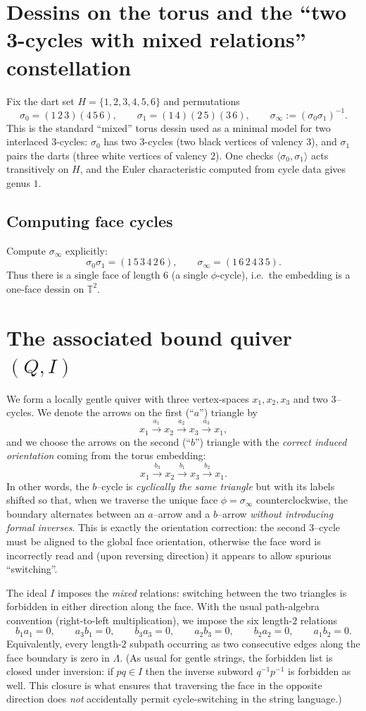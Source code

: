 \documentclass[11pt,oneside]{amsbook}
\numberwithin{equation}{section}
\theoremstyle{plain}
\theoremstyle{definition}
\theoremstyle{remark}
\begin{document}
\section{Dessins on the torus and the ``two 3-cycles with mixed relations'' constellation}
Fix the dart set $H=\{1,2,3,4,5,6\}$ and permutations
\[
\sigma_0=(1\,2\,3)(4\,5\,6),\qquad
\sigma_1=(1\,4)(2\,5)(3\,6),
\qquad
\sigma_\infty := (\sigma_0\sigma_1)^{-1}.
\]
This is the standard ``mixed'' torus dessin used as a minimal model for two interlaced 3-cycles:
$\sigma_0$ has two 3-cycles (two black vertices of valency $3$), and $\sigma_1$ pairs the darts (three white vertices of valency $2$).
One checks $\langle\sigma_0,\sigma_1\rangle$ acts transitively on $H$, and the Euler characteristic computed from cycle data
gives genus $1$.

\subsection{Computing face cycles}
Compute $\sigma_\infty$ explicitly:
\[
\sigma_0\sigma_1=(1\,5\,3\,4\,2\,6),
\qquad
\sigma_\infty=(1\,6\,2\,4\,3\,5).
\]
Thus there is a single face of length $6$ (a single $\phi$-cycle), i.e.\ the embedding is a one-face dessin on $\mathbb T^2$.

\section{The associated bound quiver $(Q,I)$}
We form a locally gentle quiver with three vertex-spaces $x_1,x_2,x_3$ and two $3$--cycles.
We denote the arrows on the first (``$a$'') triangle by
\[
x_1\xrightarrow{a_1}x_2\xrightarrow{a_2}x_3\xrightarrow{a_3}x_1,
\]
and we choose the arrows on the second (``$b$'') triangle with the \emph{correct induced orientation} coming from the torus embedding:
\[
x_1\xrightarrow{b_3}x_2\xrightarrow{b_1}x_3\xrightarrow{b_2}x_1.
\]
In other words, the $b$--cycle is \emph{cyclically the same triangle} but with its labels shifted so that, when we traverse the unique face $\phi=\sigma_\infty$ counterclockwise,
the boundary alternates between an $a$--arrow and a $b$--arrow \emph{without introducing formal inverses}.
This is exactly the orientation correction: the second $3$--cycle must be aligned to the global face orientation, otherwise the face word is incorrectly read and (upon reversing direction) it appears to allow spurious ``switching''.

The ideal $I$ imposes the \emph{mixed} relations: switching between the two triangles is forbidden in either direction along the face.
With the usual path-algebra convention (right-to-left multiplication), we impose the six length-$2$ relations
\[
b_1a_1=0,\qquad a_3b_1=0,\qquad b_3a_3=0,\qquad a_2b_3=0,\qquad b_2a_2=0,\qquad a_1b_2=0.
\]
Equivalently, every length-$2$ subpath occurring as two consecutive edges along the face boundary is zero in $\Lambda$.
(As usual for gentle strings, the forbidden list is closed under inversion: if $pq\in I$ then the inverse subword $q^{-1}p^{-1}$ is forbidden as well.
This closure is what ensures that traversing the face in the opposite direction does \emph{not} accidentally permit cycle-switching in the string language.)
\end{document}
